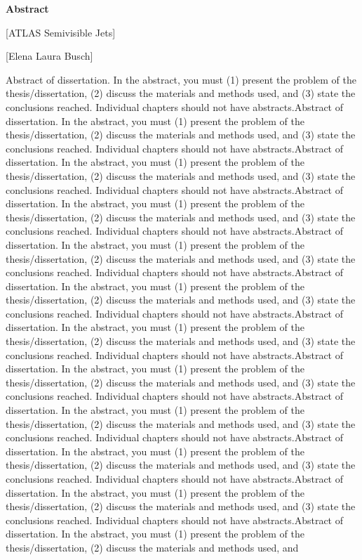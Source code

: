 
\begin{titlepage}
\begin{center}

\vspace*{5\baselineskip}
\textbf{\large Abstract}

[ATLAS Semivisible Jets]

[Elena Laura Busch]
\end{center}
\begin{flushleft}
\hspace{10mm}Abstract of dissertation. In the abstract, you must (1) present the problem of the thesis/dissertation, (2) discuss the materials and methods used, and (3) state the conclusions reached. Individual chapters should not have abstracts.Abstract of dissertation. In the abstract, you must (1) present the problem of the thesis/dissertation, (2) discuss the materials and methods used, and (3) state the conclusions reached. Individual chapters should not have abstracts.Abstract of dissertation. In the abstract, you must (1) present the problem of the thesis/dissertation, (2) discuss the materials and methods used, and (3) state the conclusions reached. Individual chapters should not have abstracts.Abstract of dissertation. In the abstract, you must (1) present the problem of the thesis/dissertation, (2) discuss the materials and methods used, and (3) state the conclusions reached. Individual chapters should not have abstracts.Abstract of dissertation. In the abstract, you must (1) present the problem of the thesis/dissertation, (2) discuss the materials and methods used, and (3) state the conclusions reached. Individual chapters should not have abstracts.Abstract of dissertation. In the abstract, you must (1) present the problem of the thesis/dissertation, (2) discuss the materials and methods used, and (3) state the conclusions reached. Individual chapters should not have abstracts.Abstract of dissertation. In the abstract, you must (1) present the problem of the thesis/dissertation, (2) discuss the materials and methods used, and (3) state the conclusions reached. Individual chapters should not have abstracts.Abstract of dissertation. In the abstract, you must (1) present the problem of the thesis/dissertation, (2) discuss the materials and methods used, and (3) state the conclusions reached. Individual chapters should not have abstracts.Abstract of dissertation. In the abstract, you must (1) present the problem of the thesis/dissertation, (2) discuss the materials and methods used, and (3) state the conclusions reached. Individual chapters should not have abstracts.Abstract of dissertation. In the abstract, you must (1) present the problem of the thesis/dissertation, (2) discuss the materials and methods used, and (3) state the conclusions reached. Individual chapters should not have abstracts.Abstract of dissertation. In the abstract, you must (1) present the problem of the thesis/dissertation, (2) discuss the materials and methods used, and (3) state the conclusions reached. Individual chapters should not have abstracts.Abstract of dissertation. In the abstract, you must (1) present the problem of the thesis/dissertation, (2) discuss the materials and methods used, and 
\end{flushleft}
\end{titlepage}
